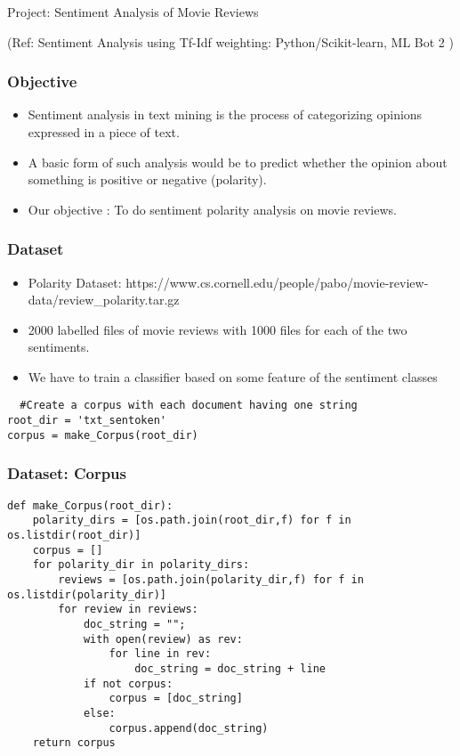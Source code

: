 \begin{frame}[fragile]\frametitle{}

\begin{center}
{\Large Project: Sentiment Analysis of Movie Reviews}

(Ref: Sentiment Analysis using Tf-Idf weighting: Python/Scikit-learn, ML Bot 2 )
\end{center}
\end{frame}

\begin{frame}[fragile]\frametitle{Objective}
  \begin{itemize}
  \item Sentiment analysis in text mining is the process of categorizing opinions expressed in a piece of text. 
  \item A basic form of such analysis would be to predict whether the opinion about something is positive or negative (polarity). 
  \item Our objective : To do sentiment polarity analysis on movie reviews.
  \end{itemize}
\end{frame}

\begin{frame}[fragile]\frametitle{Dataset}
  \begin{itemize}
  \item Polarity Dataset: https://www.cs.cornell.edu/people/pabo/movie-review-data/review\_polarity.tar.gz
  \item 2000 labelled files of movie reviews with 1000 files for each of the two sentiments.
  \item We have to train a classifier based on some feature of the sentiment classes
  \end{itemize}
    \begin{lstlisting}  
  #Create a corpus with each document having one string
root_dir = 'txt_sentoken'
corpus = make_Corpus(root_dir)
    \end{lstlisting}
\end{frame}

\begin{frame}[fragile]\frametitle{Dataset: Corpus}
    \begin{lstlisting}
def make_Corpus(root_dir):
    polarity_dirs = [os.path.join(root_dir,f) for f in os.listdir(root_dir)]    
    corpus = []    
    for polarity_dir in polarity_dirs:
        reviews = [os.path.join(polarity_dir,f) for f in os.listdir(polarity_dir)]
        for review in reviews:
            doc_string = "";
            with open(review) as rev:
                for line in rev:
                    doc_string = doc_string + line
            if not corpus:
                corpus = [doc_string]
            else:
                corpus.append(doc_string)
    return corpus
    \end{lstlisting}
\end{frame}

